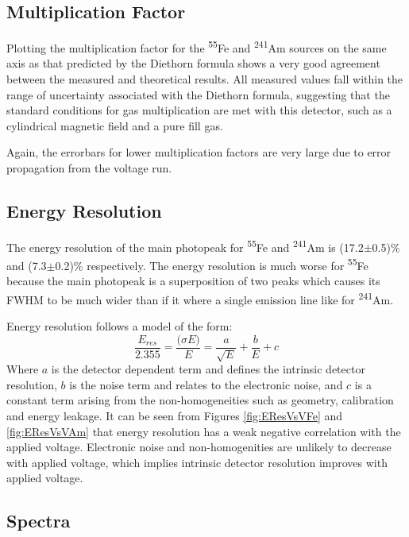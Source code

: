 \subsection{Multiplication Factor}

Plotting the multiplication factor for the \textsuperscript{55}Fe and \textsuperscript{241}Am sources on the same axis as that predicted by the Diethorn formula shows a very good agreement between the measured and theoretical results. All measured values fall within the range of uncertainty associated with the Diethorn formula, suggesting that the standard conditions for gas multiplication are met with this detector, such as a cylindrical magnetic field and a pure fill gas.

Again, the errorbars for lower multiplication factors are very large due to error propagation from the voltage run.

\subsection{Energy Resolution}

The energy resolution of the main photopeak for \textsuperscript{55}Fe and \textsuperscript{241}Am is (17.2$\pm$0.5)\% and (7.3$\pm$0.2)\% respectively. The energy resolution is much worse for \textsuperscript{55}Fe because the main photopeak is a superposition of two peaks which causes its FWHM to be much wider than if it where a single emission line like for \textsuperscript{241}Am.

Energy resolution follows a model of the form:
\begin{equation}
    \frac{E_{res}}{2.355} = \frac{\big( \sigma E \big)}{E} = \frac{a}{\sqrt{E}}+\frac{b}{E}+c
\end{equation}
Where $a$ is the detector dependent term and defines the intrinsic detector resolution, $b$ is the noise term and relates to the electronic noise, and $c$ is a constant term arising from the non-homogeneities such as geometry, calibration and energy leakage.
It can be seen from Figures \ref{fig:EResVsVFe} and \ref{fig:EResVsVAm} that energy resolution has a weak negative correlation with the applied voltage. Electronic noise and non-homogenities are unlikely to decrease with applied voltage, which implies intrinsic detector resolution improves with applied voltage.

\subsection{Spectra}

